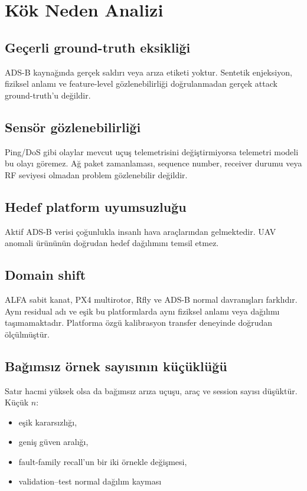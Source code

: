 \documentclass[11pt,a4paper,oneside]{report}
\begin{document}
\chapter{Kök Neden Analizi}

\section{Geçerli ground-truth eksikliği}

ADS-B kaynağında gerçek saldırı veya arıza etiketi yoktur. Sentetik
enjeksiyon, fiziksel anlamı ve feature-level gözlenebilirliği doğrulanmadan
gerçek attack ground-truth'u değildir.

\section{Sensör gözlenebilirliği}

Ping/DoS gibi olaylar mevcut uçuş telemetrisini değiştirmiyorsa telemetri
modeli bu olayı göremez. Ağ paket zamanlaması, sequence number, receiver
durumu veya RF seviyesi olmadan problem gözlenebilir değildir.

\section{Hedef platform uyumsuzluğu}

Aktif ADS-B verisi çoğunlukla insanlı hava araçlarından gelmektedir. UAV
anomali ürününün doğrudan hedef dağılımını temsil etmez.

\section{Domain shift}

ALFA sabit kanat, PX4 multirotor, Rfly ve ADS-B normal davranışları farklıdır.
Aynı residual adı ve eşik bu platformlarda aynı fiziksel anlamı veya
dağılımı taşımamaktadır. Platforma özgü kalibrasyon transfer deneyinde
doğrudan ölçülmüştür.

\section{Bağımsız örnek sayısının küçüklüğü}

Satır hacmi yüksek olsa da bağımsız arıza uçuşu, araç ve session sayısı
düşüktür. Küçük \(n\):

\begin{itemize}
  \item eşik kararsızlığı,
  \item geniş güven aralığı,
  \item fault-family recall'un bir iki örnekle değişmesi,
  \item validation--test normal dağılım kayması
\end{itemize}
\end{document}

